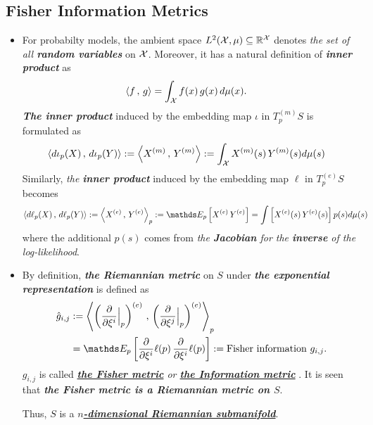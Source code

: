 \documentclass[11pt]{article}
\begin{document}
\subsection{Fisher Information Metrics}
\begin{itemize}
\item \begin{remark}
For probabilty models, the ambient space $L^2({\mathcal X}, \mu) \subseteq {\mathbb R}^{{\mathcal X}}$ denotes \emph{the set of all \textbf{random variables}} on ${\mathcal X}$. Moreover, it has a natural definition of \emph{\textbf{inner product}} as 
\begin{align*}
\left\langle f\,,\, g \right\rangle &= \int_{{\mathcal X}} f(x)\,g(x)\, d\mu(x). 
\end{align*}  \emph{\textbf{The inner product}} induced by the embedding map $\iota$ in $T^{(m)}_pS$ is formulated as 
\begin{align}
\left\langle d\iota_p(X)\,,\, d\iota_{p}(Y) \right\rangle := \left\langle X^{(m)}\,,\, Y^{(m)} \right\rangle &:=  \int_{{\mathcal X}} X^{(m)}(s)\,Y^{(m)}(s) d\mu(s) \label{eqn: inner_product_mix}
\end{align}
Similarly,  \emph{the \textbf{inner product}} induced by the embedding map $\ell$ in $T^{(e)}_pS$ becomes
\begin{align}
\inn{d\ell_p(X)}{d\ell_{p}(Y)} := \inn{X^{(e)}}{Y^{(e)}}_{p} &:= \E{p}{X^{(e)}\,Y^{(e)}}=  \int \brac{X^{(e)}(s)\,Y^{(e)}(s)} p(s) d\mu(s)  \label{eqn: inner_product_exp}
\end{align} where the additional $p(s)$ comes from \emph{the \textbf{Jacobian} for the \textbf{inverse} of the log-likelihood}.
\end{remark}

\item By definition, \emph{\textbf{the Riemannian metric}} on $S$ under \emph{\textbf{the exponential representation}} is defined as 
\begin{align*}
\hat{g}_{i,j} &:= \inn{\paren{\partdiff{}{\xi^i}\Bigr|_{p}}^{(e)}}{\paren{\partdiff{}{\xi^j}\Bigr|_{p}}^{(e)}}_{p} \\
&= \E{p}{ \partdiff{}{\xi^i}\ell(p)\, \partdiff{}{\xi^i}\ell(p)} := \text{Fisher information }g_{i,j} .
\end{align*}  $g_{i,j}$ is called \emph{\underline{\textbf{the Fisher metric}} or \underline{\textbf{the Information metric}}} \citep{amari2007methods}. It is seen that  \emph{\textbf{the Fisher metric is a Riemannian metric on $S$}}. 

Thus, $S$ is a \underline{\emph{\textbf{$n$-dimensional Riemannian submanifold}}}.
\end{itemize}
\end{document}
